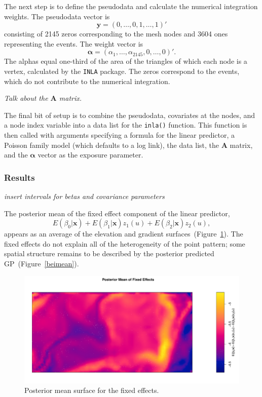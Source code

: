 \documentclass[]{interact}
\begin{document}
The next step is to define the pseudodata and calculate the numerical
integration weights. The pseudodata vector is
\begin{displaymath}
\mathbf{y} = (0, \dots, 0, 1, \dots, 1)'
\end{displaymath}
consisting of 2145 zeros corresponding to the mesh nodes and 3604 ones
representing the events. The weight vector is
\begin{displaymath}
\boldsymbol{\alpha} = (\alpha_{1}, \dots, \alpha_{2145}, 0, \dots, 0)'.
\end{displaymath}
The alphas equal one-third of the area of the triangles of which each node is
a vertex, calculated by the \texttt{INLA} package. The zeros correspond to the
events, which do not contribute to the numerical integration.

{\it Talk about the \(\mathbf{A}\) matrix.}

The final bit of setup is to combine the pseudodata, covariates at the nodes,
and a node index variable into a data list for the \texttt{inla()} function.
This function is then called with arguments specifying a formula for the
linear predictor, a Poisson family model (which defaults to a log link), the
data list, the \(\mathbf{A}\) matrix, and the \(\boldsymbol{\alpha}\) vector as
the exposure parameter.


\subsubsection{Results}

{\it insert intervals for betas and covariance parameters}

The posterior mean of the fixed effect component of the linear predictor,
\begin{displaymath}
E(\beta_{0} | \mathbf{x}) + E(\beta_{1} | \mathbf{x}) z_{1}(u)
+ E(\beta_{2} | \mathbf{x}) z_{2}(u),
\end{displaymath}
appears as an average of the elevation and gradient
surfaces~(Figure~\ref{beibetas}). The fixed effects do not explain all of the
heterogeneity of the point pattern; some spatial structure remains to be
described by the posterior predicted GP~(Figure~\ref{beimean}).

\begin{figure}[h]
\includegraphics[width=\textwidth]{figures/beibetas.pdf}
\caption{Posterior mean surface for the fixed effects.}
\label{beibetas}
\end{figure}
\end{document}
